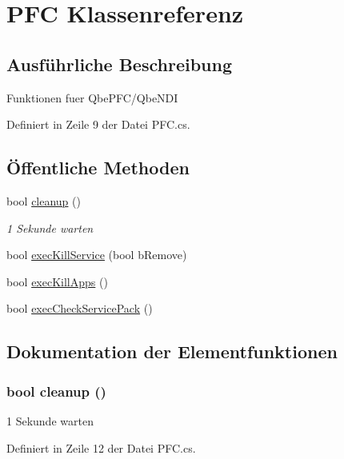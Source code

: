 \hypertarget{classQbeSAS_1_1PFC}{
\section{PFC Klassenreferenz}
\label{classQbeSAS_1_1PFC}
}


\subsection{Ausf\"{u}hrliche Beschreibung}
Funktionen fuer Qbe\-PFC/Qbe\-NDI



Definiert in Zeile 9 der Datei PFC.cs.\subsection*{\"{O}ffentliche Methoden}
\begin{CompactItemize}
\item 
bool \hyperlink{classQbeSAS_1_1PFC_QbeSAS_1_1PFCa0}{cleanup} ()
\begin{CompactList}\small\item\em 1 Sekunde warten \item\end{CompactList}\item 
bool \hyperlink{classQbeSAS_1_1PFC_QbeSAS_1_1PFCa1}{exec\-Kill\-Service} (bool b\-Remove)
\item 
bool \hyperlink{classQbeSAS_1_1PFC_QbeSAS_1_1PFCa2}{exec\-Kill\-Apps} ()
\item 
bool \hyperlink{classQbeSAS_1_1PFC_QbeSAS_1_1PFCa3}{exec\-Check\-Service\-Pack} ()
\end{CompactItemize}


\subsection{Dokumentation der Elementfunktionen}
\hypertarget{classQbeSAS_1_1PFC_QbeSAS_1_1PFCa0}{
\subsubsection[cleanup]{\setlength{\rightskip}{0pt plus 5cm}bool cleanup ()}}
\label{classQbeSAS_1_1PFC_QbeSAS_1_1PFCa0}


1 Sekunde warten 



Definiert in Zeile 12 der Datei PFC.cs.

